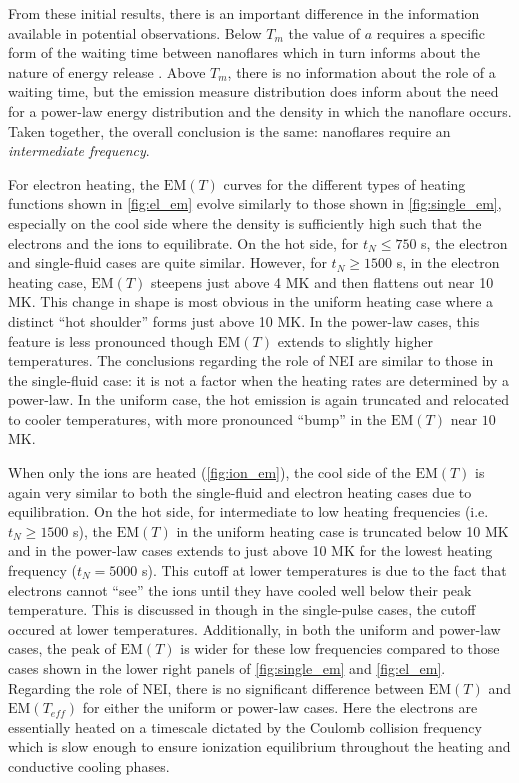 \documentclass[preprint,linenumbers]{aastex}
\begin{document}
	\par From these initial results, there is an important difference in the information available in potential observations. Below $T_m$ the value of $a$ requires a specific form of the waiting time between nanoflares which in turn informs about the nature of energy release \citep{cargill_active_2014}. Above $T_m$, there is no information about the role of a waiting time, but the emission measure distribution does inform about the need for a power-law energy distribution and the density in which the nanoflare occurs. Taken together, the overall conclusion is the same: nanoflares require an \textit{intermediate frequency}. 
	\par For electron heating, the $\mathrm{EM}(T)$ curves for the different types of heating functions shown in \autoref{fig:el_em} evolve similarly to those shown in \autoref{fig:single_em}, especially on the cool side where the density is sufficiently high such that the electrons and the ions to equilibrate. On the hot side, for $t_N\le750$ s, the electron and single-fluid cases are quite similar. However, for $t_N\ge1500$ s, in the electron heating case, $\mathrm{EM}(T)$ steepens just above 4 MK and then flattens out near 10 MK. This change in shape is most obvious in the uniform heating case where a distinct ``hot shoulder'' forms just above 10 MK. In the power-law cases, this feature is less pronounced though $\mathrm{EM}(T)$ extends to slightly higher temperatures. The conclusions regarding the role of NEI are similar to those in the single-fluid case: it is not a factor when the heating rates are determined by a power-law. In the uniform case, the hot emission is again truncated and relocated to cooler temperatures, with more pronounced ``bump'' in the $\mathrm{EM}(T)$ near $10$ MK.
	\par When only the ions are heated (\autoref{fig:ion_em}), the cool side of the $\mathrm{EM}(T)$ is again very similar to both the single-fluid and electron heating cases due to equilibration. On the hot side, for intermediate to low heating frequencies (i.e. $t_N\ge1500$ s), the $\mathrm{EM}(T)$ in the uniform heating case is truncated below 10 MK and in the power-law cases extends to just above 10 MK for the lowest heating frequency ($t_N=5000$ s). This cutoff at lower temperatures is due to the fact that electrons cannot ``see'' the ions until they have cooled well below their peak temperature. This is discussed in  though in the single-pulse cases, the cutoff occured at lower temperatures. Additionally, in both the uniform and power-law cases, the peak of $\mathrm{EM}(T)$ is wider for these low frequencies compared to those cases shown in the lower right panels of \autoref{fig:single_em} and \autoref{fig:el_em}. Regarding the role of NEI, there is no significant difference between $\mathrm{EM}(T)$ and $\mathrm{EM}(T_{eff})$ for either the uniform or power-law cases. Here the electrons are essentially heated on a timescale dictated by the Coulomb collision frequency which is slow enough to ensure ionization equilibrium throughout the heating and conductive cooling phases.
\end{document}
